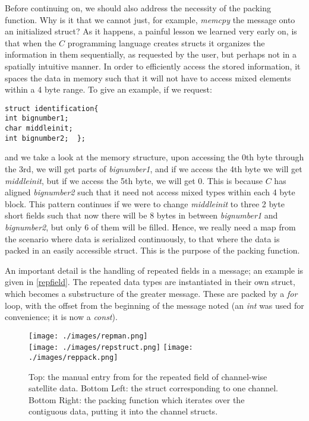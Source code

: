 Before continuing on, we should also address the necessity of the packing function. Why is it that we cannot just, for example, \textit{memcpy} the message onto an initialized struct? As it happens, a painful lesson we learned very early on, is that when the $C$ programming language creates structs it organizes the information in them sequentially, as requested by the user, but perhaps not in a spatially intuitive manner. In order to efficiently access the stored information, it spaces the data in memory such that it will not have to access mixed elements within a 4 byte range. To give an example, if we request:
\begin{verbatim}
struct identification{
int bignumber1;
char middleinit;
int bignumber2;  };
\end{verbatim}
and we take a look at the memory structure, upon accessing the 0th byte through the 3rd, we will get parts of \textit{bignumber1}, and if we access the 4th byte we will get \textit{middleinit}, but if we access the 5th byte, we will get 0. This is because $C$ has aligned \textit{bignumber2} such that it need not access mixed types within each 4 byte block. This pattern continues if we were to change \textit{middleinit} to three 2 byte short fields such that now there will be 8 bytes in between \textit{bignumber1} and \textit{bignumber2}, but only 6 of them will be filled. Hence, we really need a map from the scenario where data is serialized continuously, to that where the data is packed in an easily accessible struct. This is the purpose of the packing function.

An important detail is the handling of repeated fields in a message; an example is given in \autoref{repfield}. The repeated data types are instantiated in their own struct, which becomes a substructure of the greater message. These are packed by a \textit{for} loop, with the offset from the beginning of the message noted (an \textit{int} was used for convenience; it is now a \textit{const}). 

\begin{figure}[H]
\centering
\texttt{[image: ./images/repman.png]} \vspace{10 pt} \\

\texttt{[image: ./images/repstruct.png]}
\texttt{[image: ./images/reppack.png]}
\caption[Handling Repeated Fields]{Top: the manual entry from \textcite{m12muser} for the repeated field of channel-wise satellite data. Bottom Left: the struct corresponding to one channel. Bottom Right: the packing function which iterates over the contiguous data, putting it into the channel structs.}
\label{repfield}
\end{figure}

